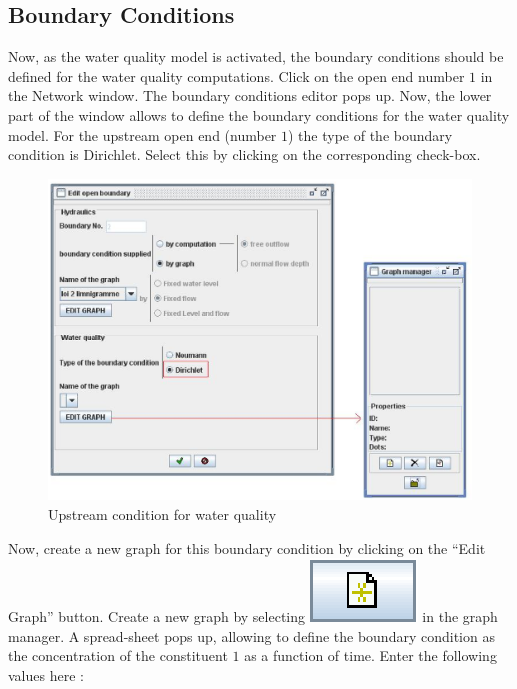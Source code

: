 \documentclass[a4paper,12pt]{article}
\begin{document}
\subsection{Boundary Conditions }

\hspace{0.5cm}Now, as the water quality model is activated, the boundary conditions
should be defined for the water quality computations. Click on the
open end number $1$ in the Network window. The boundary conditions editor
pops up. Now, the lower part of the window allows to define the
boundary conditions for the water quality model. For the upstream
open end (number $1$) the type of the boundary condition is Dirichlet.
Select this by clicking on the corresponding check-box. 

\begin{figure}[h]
  \begin{center}
  \includegraphics[scale=0.6]{BCQ}
  \caption{Upstream condition for water quality}
  \label{fig:BCQ_lib}
  \end{center}
\end{figure}

\hspace{0.5cm}Now, create a new graph for this boundary condition by clicking on the {}``Edit
Graph'' button. Create a new graph by selecting \includegraphics[scale=0.6]{new} in
the graph manager. A spread-sheet pops up, allowing to define
the boundary condition as the concentration of the constituent $1$ as
a function of time. Enter the following values here : 
\end{document}
